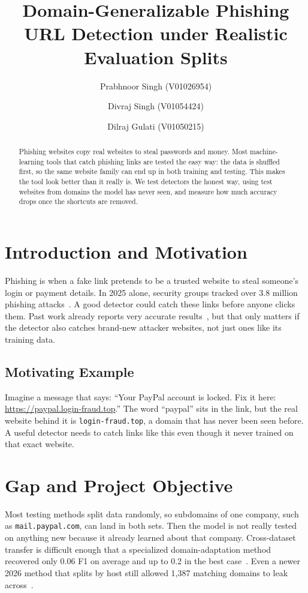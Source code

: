 \documentclass[sigconf,nonacm]{acmart}
\title{Domain-Generalizable Phishing URL Detection under Realistic Evaluation Splits}
\author{Prabhnoor Singh (V01026954)}
\affiliation{%
  \institution{University of Victoria}
  \city{Victoria}
  \country{Canada}}
\author{Divraj Singh (V01054424)}
\affiliation{%
  \institution{University of Victoria}
  \city{Victoria}
  \country{Canada}}
\author{Dilraj Gulati (V01050215)}
\affiliation{%
  \institution{University of Victoria}
  \city{Victoria}
  \country{Canada}}
\begin{document}
\begin{abstract}
Phishing websites copy real websites to steal passwords and money. Most machine-learning tools that catch phishing links are tested the easy way: the data is shuffled first, so the same website family can end up in both training and testing. This makes the tool look better than it really is. We test detectors the honest way, using test websites from domains the model has never seen, and measure how much accuracy drops once the shortcuts are removed.
\end{abstract}


\maketitle

\section{Introduction and Motivation}
Phishing is when a fake link pretends to be a trusted website to steal someone's login or payment details. In 2025 alone, security groups tracked over 3.8 million phishing attacks~\cite{apwg2026}. A good detector could catch these links before anyone clicks them. Past work already reports very accurate results~\cite{prasad2024}, but that only matters if the detector also catches brand-new attacker websites, not just ones like its training data.

\subsection{Motivating Example}
Imagine a message that says: ``Your PayPal account is locked. Fix it here: \url{https://paypal.login-fraud.top}.'' The word ``paypal'' sits in the link, but the real website behind it is \texttt{login-fraud.top}, a domain that has never been seen before. A useful detector needs to catch links like this even though it never trained on that exact website.

\section{Gap and Project Objective}
Most testing methods split data randomly, so subdomains of one company, such as \texttt{mail.paypal.com}, can land in both sets. Then the model is not really tested on anything new because it already learned about that company. Cross-dataset transfer is difficult enough that a specialized domain-adaptation method recovered only 0.06 F1 on average and up to 0.2 in the best case~\cite{rashid2024}. Even a newer 2026 method that splits by host still allowed 1,387 matching domains to leak across~\cite{ahamed2026}.
\end{document}
